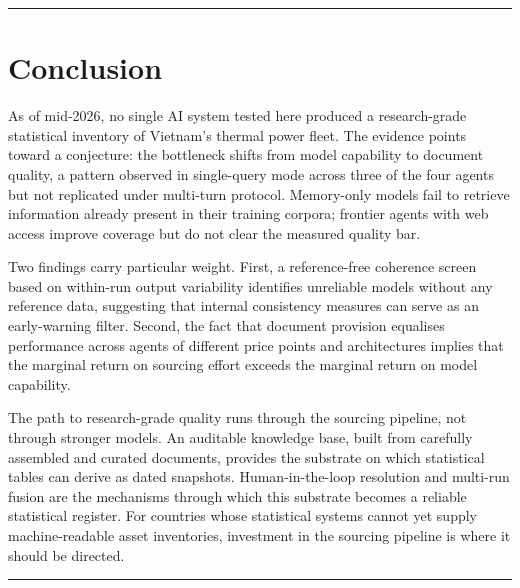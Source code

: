 \documentclass[a4paper,11pt]{article}
\begin{document}
\begin{center}\rule{0.5\linewidth}{0.5pt}\end{center}

\section{Conclusion}\label{sec:conclusion}

As of mid-2026, no single AI system tested here produced a research-grade statistical inventory of Vietnam's thermal power fleet. The evidence points toward a conjecture: the bottleneck shifts from model capability to document quality, a pattern observed in single-query mode across three of the four agents but not replicated under multi-turn protocol. Memory-only models fail to retrieve information already present in their training corpora; frontier agents with web access improve coverage but do not clear the measured quality bar.

Two findings carry particular weight. First, a reference-free coherence screen based on within-run output variability identifies unreliable models without any reference data, suggesting that internal consistency measures can serve as an early-warning filter. Second, the fact that document provision equalises performance across agents of different price points and architectures implies that the marginal return on sourcing effort exceeds the marginal return on model capability.

The path to research-grade quality runs through the sourcing pipeline, not through stronger models. An auditable knowledge base, built from carefully assembled and curated documents, provides the substrate on which statistical tables can derive as dated snapshots. Human-in-the-loop resolution and multi-run fusion are the mechanisms through which this substrate becomes a reliable statistical register. For countries whose statistical systems cannot yet supply machine-readable asset inventories, investment in the sourcing pipeline is where it should be directed.

\begin{center}\rule{0.5\linewidth}{0.5pt}\end{center}

\appendix
\renewcommand{\thesection}{Annex \Alph{section}}
\renewcommand{\thefigure}{S\arabic{figure}}
\renewcommand{\theHfigure}{S\arabic{figure}}
\setcounter{figure}{0}
\end{document}
